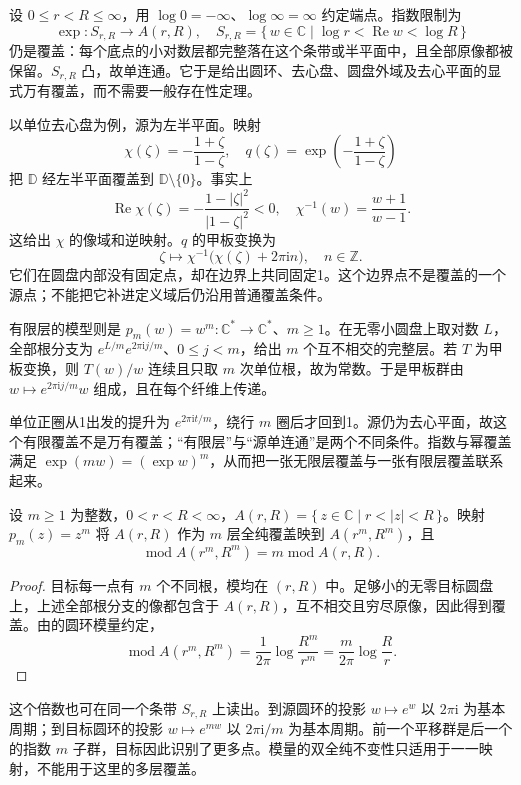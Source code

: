设 \(0\le r<R\le\infty\)，用 \(\log0=-\infty\)、\(\log\infty=\infty\) 约定端点。指数限制为
\[
 \exp:S_{r,R}\longrightarrow A(r,R),\quad
 S_{r,R}=\{\,w\in\mathbb C\mid\log r<\operatorname{Re}w<\log R\,\}
\]
仍是覆盖：每个底点的小对数层都完整落在这个条带或半平面中，且全部原像都被保留。\(S_{r,R}\) 凸，故单连通。它于是给出圆环、去心盘、圆盘外域及去心平面的显式万有覆盖，而不需要一般存在性定理。

\ProseParagraphBreak
以单位去心盘为例，源为左半平面。映射
\[
 \chi(\zeta)=-\frac{1+\zeta}{1-\zeta},\quad
 q(\zeta)=\exp\left(-\frac{1+\zeta}{1-\zeta}\right)
\]
把 \(\mathbb D\) 经左半平面覆盖到 \(\mathbb D\setminus\{0\}\)。事实上
\[
 \operatorname{Re}\chi(\zeta)
 =-\frac{1-|\zeta|^2}{|1-\zeta|^2}<0,
 \quad
 \chi^{-1}(w)=\frac{w+1}{w-1}.
\]
这给出 \(\chi\) 的像域和逆映射。\(q\) 的甲板变换为
\[
 \zeta\longmapsto
 \chi^{-1}\bigl(\chi(\zeta)+2\pi\mathrm{i}n\bigr),\quad n\in\mathbb Z.
\]
它们在圆盘内部没有固定点，却在边界上共同固定1。这个边界点不是覆盖的一个源点；不能把它补进定义域后仍沿用普通覆盖条件。

\ProseParagraphBreak
有限层的模型则是 \(p_m(w)=w^m:\mathbb C^*\to\mathbb C^*\)、\(m\ge1\)。在无零小圆盘上取对数 \(L\)，全部根分支为 \(e^{L/m}e^{2\pi\mathrm{i}j/m}\)、\(0\le j<m\)，给出 \(m\) 个互不相交的完整层。若 \(T\) 为甲板变换，则 \(T(w)/w\) 连续且只取 \(m\) 次单位根，故为常数。于是甲板群由 \(w\mapsto e^{2\pi\mathrm{i}j/m}w\) 组成，且在每个纤维上传递。

\ProseParagraphBreak
单位正圈从1出发的提升为 \(e^{2\pi\mathrm{i}t/m}\)，绕行 \(m\) 圈后才回到1。源仍为去心平面，故这个有限覆盖不是万有覆盖；“有限层”与“源单连通”是两个不同条件。指数与幂覆盖满足 \(\exp(mw)=(\exp w)^m\)，从而把一张无限层覆盖与一张有限层覆盖联系起来。

\begin{proposition}[圆环的有限层覆盖]\label{b3:prop:11-annulus-power-cover}
设 \(m\ge1\) 为整数，\(0<r<R<\infty\)，\(A(r,R)=\{\,z\in\mathbb C\mid r<|z|<R\,\}\)。映射 \(p_m(z)=z^m\) 将 \(A(r,R)\) 作为 \(m\) 层全纯覆盖映到 \(A(r^m,R^m)\)，且
\[
 \operatorname{mod}A(r^m,R^m)
 =m\operatorname{mod}A(r,R).
\]
\end{proposition}
\begin{proof}
目标每一点有 \(m\) 个不同根，模均在 \((r,R)\) 中。足够小的无零目标圆盘上，上述全部根分支的像都包含于 \(A(r,R)\)，互不相交且穷尽原像，因此得到覆盖。由的圆环模量约定，
\[
 \operatorname{mod}A(r^m,R^m)
 =\frac1{2\pi}\log\frac{R^m}{r^m}
 =\frac{m}{2\pi}\log\frac Rr.
\]
\end{proof}
这个倍数也可在同一个条带 \(S_{r,R}\) 上读出。到源圆环的投影 \(w\mapsto e^w\) 以 \(2\pi\mathrm{i}\) 为基本周期；到目标圆环的投影 \(w\mapsto e^{mw}\) 以 \(2\pi\mathrm{i}/m\) 为基本周期。前一个平移群是后一个的指数 \(m\) 子群，目标因此识别了更多点。模量的双全纯不变性只适用于一一映射，不能用于这里的多层覆盖。


